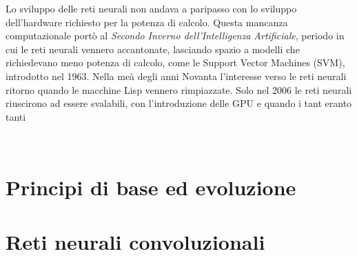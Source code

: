 Lo sviluppo delle reti neurali non andava a paripasso con lo sviluppo dell'hardware richiesto per la potenza di calcolo. Questa mancanza computazionale portò al \textsl{Secondo Inverno dell'Intelligenza Artificiale}, periodo in cui le reti neurali vennero accantonate, lasciando spazio a modelli che richiedevano meno potenza di calcolo, come le Support Vector Machines (SVM), introdotto nel 1963. Nella meà degli anni Novanta l'interesse verso le reti neurali ritorno quando le macchine Lisp vennero rimpiazzate. Solo nel 2006 le reti neurali riuscirono ad essere svalabili, con l'introduzione delle GPU e quando i tant eranto tanti

\,\cite{muthukrishnan2020brief}

\section{Principi di base ed evoluzione}
% 




\section{Reti neurali convoluzionali}
% 




\,\cite{muthukrishnan2020brief}



